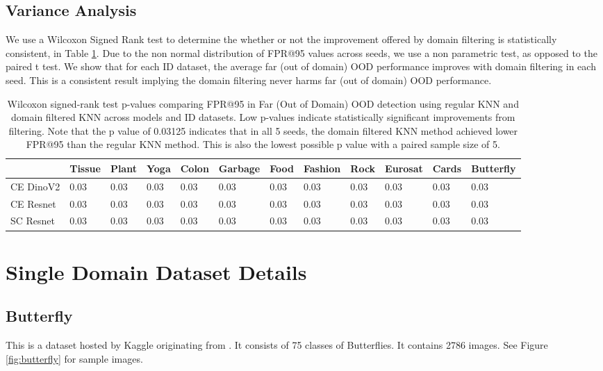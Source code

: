 \documentclass[letterpaper]{article} %
\theoremstyle{plain}
\theoremstyle{definition}
\theoremstyle{remark}
\begin{document}
\subsection{Variance Analysis}

\label{variance}

We use a Wilcoxon Signed Rank test to determine the whether or not the improvement offered by domain filtering is statistically consistent, in Table \ref{tab:var}. Due to the non normal distribution of FPR@95 values across seeds, we use a non parametric test, as opposed to the paired t test. We show that for each ID dataset, the average far (out of domain) OOD performance improves with domain filtering in each seed. This is a consistent result implying the domain filtering never harms far (out of domain) OOD performance.


\begin{table}
    

\caption{Wilcoxon signed-rank test p-values comparing FPR@95 in Far (Out of Domain) OOD detection using regular KNN and domain filtered KNN across models and ID datasets. Low p-values indicate statistically significant improvements from filtering. Note that the p value of 0.03125 indicates that in all 5 seeds, the domain filtered KNN method achieved lower FPR@95 than the regular KNN method. This is also the lowest possible p value with a paired sample size of 5.}
\label{tab:var}
\begin{tabular}{llllllllllll}
\toprule
 & Tissue & Plant & Yoga & Colon & Garbage & Food & Fashion & Rock & Eurosat & Cards & Butterfly \\
\midrule
CE DinoV2 & 0.03 & 0.03 & 0.03 & 0.03 & 0.03 & 0.03 & 0.03 & 0.03 & 0.03 & 0.03 & 0.03 \\
CE Resnet & 0.03 & 0.03 & 0.03 & 0.03 & 0.03 & 0.03 & 0.03 & 0.03 & 0.03 & 0.03 & 0.03 \\
SC Resnet & 0.03 & 0.03 & 0.03 & 0.03 & 0.03 & 0.03 & 0.03 & 0.03 & 0.03 & 0.03 & 0.03 \\
\bottomrule
\end{tabular}
\end{table}

\section{Single Domain Dataset Details}

\label{dataset}


\subsection{Butterfly}  This is a dataset hosted by Kaggle originating from \citep{AIPlanet_DataSprint107_2024}. It consists of 75 classes of Butterflies. It contains 2786 images. See Figure \ref{fig:butterfly} for sample images. 
\end{document}
